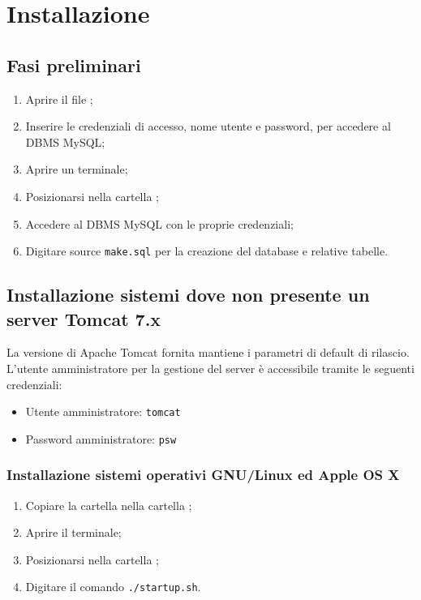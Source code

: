 \section{Installazione}{

\subsection{Fasi preliminari}{
\begin{enumerate}
	\item Aprire il file ;
	\item Inserire le credenziali di accesso, nome utente e password, per accedere al DBMS MySQL;
	\item Aprire un terminale;
	\item Posizionarsi nella cartella ;
	\item Accedere al DBMS MySQL con le proprie credenziali;
	\item Digitare source \texttt{make.sql} per la creazione del database e relative tabelle.
\end{enumerate}

}

\subsection{Installazione sistemi dove non presente un server Tomcat 7.x}{
La versione di Apache Tomcat fornita mantiene i parametri di default di rilascio. L'utente amministratore per la gestione del server è accessibile tramite le seguenti credenziali:
\begin{itemize}
	\item Utente amministratore: \texttt{tomcat}
	\item Password amministratore: \texttt{psw}
\end{itemize}

	\subsubsection{Installazione sistemi operativi GNU/Linux ed Apple OS X}{
		\begin{enumerate}
			\item Copiare la cartella  nella cartella ;
			\item Aprire il terminale;
			\item Posizionarsi nella cartella ;
			\item Digitare il comando \texttt{./startup.sh}.
		\end{enumerate}
	}
	
}}
